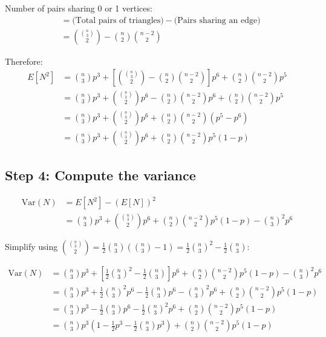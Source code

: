 \documentclass[11pt]{article}
\begin{document}
Number of pairs sharing 0 or 1 vertices:
\begin{align*}
&= \text{(Total pairs of triangles)} - \text{(Pairs sharing an edge)} \\
&= \binom{\binom{n}{3}}{2} - \binom{n}{2}\binom{n-2}{2}
\end{align*}

Therefore:
\begin{align*}
E[N^2] &= \binom{n}{3} p^3 + \left[\binom{\binom{n}{3}}{2} - \binom{n}{2}\binom{n-2}{2}\right] p^6 + \binom{n}{2}\binom{n-2}{2} p^5 \\
&= \binom{n}{3} p^3 + \binom{\binom{n}{3}}{2} p^6 - \binom{n}{2}\binom{n-2}{2} p^6 + \binom{n}{2}\binom{n-2}{2} p^5 \\
&= \binom{n}{3} p^3 + \binom{\binom{n}{3}}{2} p^6 + \binom{n}{2}\binom{n-2}{2} (p^5 - p^6) \\
&= \binom{n}{3} p^3 + \binom{\binom{n}{3}}{2} p^6 + \binom{n}{2}\binom{n-2}{2} p^5(1-p)
\end{align*}

\subsection*{Step 4: Compute the variance}

\begin{align*}
\text{Var}(N) &= E[N^2] - (E[N])^2 \\
&= \binom{n}{3} p^3 + \binom{\binom{n}{3}}{2} p^6 + \binom{n}{2}\binom{n-2}{2} p^5(1-p) - \binom{n}{3}^2 p^6
\end{align*}

Simplify using $\binom{\binom{n}{3}}{2} = \frac{1}{2}\binom{n}{3}\left(\binom{n}{3}-1\right) = \frac{1}{2}\binom{n}{3}^2 - \frac{1}{2}\binom{n}{3}$:

\begin{align*}
\text{Var}(N) &= \binom{n}{3} p^3 + \left[\frac{1}{2}\binom{n}{3}^2 - \frac{1}{2}\binom{n}{3}\right] p^6 + \binom{n}{2}\binom{n-2}{2} p^5(1-p) - \binom{n}{3}^2 p^6 \\
&= \binom{n}{3} p^3 + \frac{1}{2}\binom{n}{3}^2 p^6 - \frac{1}{2}\binom{n}{3} p^6 - \binom{n}{3}^2 p^6 + \binom{n}{2}\binom{n-2}{2} p^5(1-p) \\
&= \binom{n}{3} p^3 - \frac{1}{2}\binom{n}{3} p^6 - \frac{1}{2}\binom{n}{3}^2 p^6 + \binom{n}{2}\binom{n-2}{2} p^5(1-p) \\
&= \binom{n}{3} p^3\left(1 - \frac{1}{2}p^3 - \frac{1}{2}\binom{n}{3} p^3\right) + \binom{n}{2}\binom{n-2}{2} p^5(1-p)
\end{align*}
\end{document}
